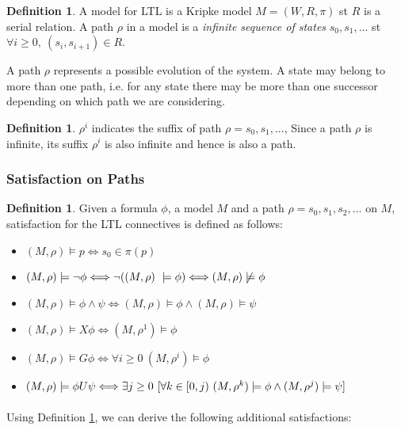 \documentclass{article}
\theoremstyle{plain}
\theoremstyle{definition}
\newtheorem{defn}[thm]{Definition} %
\begin{document}
\begin{multicols}{2}
\begin{defn}A model for LTL is a Kripke model $M = (W, R, \pi)$ st $R$ is a serial relation. A path $\rho$ in a model is a \textit{infinite sequence of states} $s_0, s_1, ...$ st $\forall i \geq 0,\ (s_i, s_{i+1})\in R$. \end{defn}

A path $\rho$ represents a possible evolution of the system. A state may belong to more than one path, i.e. for any state there may be more than one successor depending on which path we are considering.

\begin{defn}$\rho^i$ indicates the suffix of path $\rho = s_0,s_1,...$, Since a path $\rho$ is infinite, its suffix $\rho^i$ is also infinite and hence is also a path.\end{defn}

\subsubsection{Satisfaction on Paths}\label{subsubsec:LTLSemanticsPath}
\begin{defn}\label{defn:ltlsatisfaction}
Given a formula $\phi$, a model $M$ and a path $\rho = s_0, s_1, s_2,...$ on $M$, satisfaction for the LTL connectives is defined as follows:
\end{defn}

\begin{itemize}
\item $(M, \rho) \models p \Longleftrightarrow s_0 \in \pi(p)$
\item $(M, \rho) \models \lnot\phi \Longleftrightarrow \lnot ((M, \rho)\ \models \phi)\\ \Longleftrightarrow (M, \rho) \not\models \phi$
\item $(M, \rho) \models \phi\land\psi \Longleftrightarrow (M, \rho) \models \phi \land (M, \rho) \models \psi$
\item $(M, \rho) \models X\phi \Longleftrightarrow (M, \rho^1) \models \phi$
\item $(M, \rho) \models G\phi \Longleftrightarrow \forall i \geq 0\ (M, \rho^i) \models \phi$
\item $(M, \rho) \models \phi U\psi \Longleftrightarrow\\ \exists j \geq 0\ \lbrack\forall k \in [0, j)\ (M, \rho^k) \models \phi \land (M, \rho^j) \models \psi\rbrack$
\end{itemize}

\paragraph{} Using Definition \ref{defn:ltlsatisfaction}, we can derive the following additional satisfactions:


\end{multicols}
\end{document}
